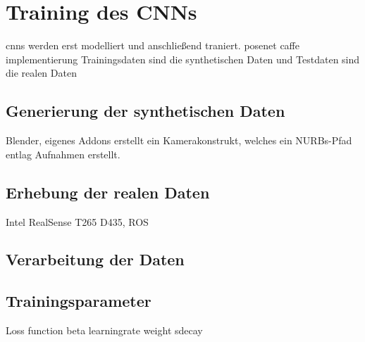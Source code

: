 
\section{Training des CNNs}
cnns werden erst modelliert und anschließend traniert.
posenet caffe implementierung
Trainingsdaten sind die synthetischen Daten und Testdaten sind die realen Daten


\subsection{Generierung der synthetischen Daten}
Blender,
eigenes Addons erstellt ein Kamerakonstrukt, welches ein NURBs-Pfad entlag Aufnahmen erstellt.

\subsection{Erhebung der realen Daten}
Intel RealSense T265 D435, ROS

\subsection{Verarbeitung der Daten}


\subsection{Trainingsparameter}

Loss function beta
learningrate
weight sdecay